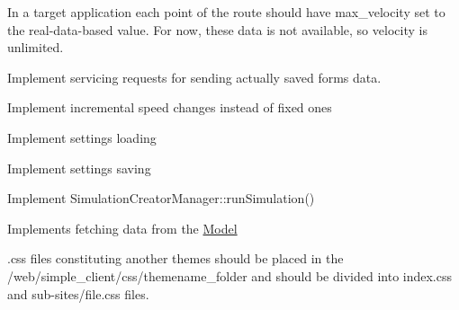 \begin{DoxyRefList}
\label{todo__todo000006}%
%
In a target application each point of the route should have max\+\_\+velocity set to the real-\/data-\/based value. For now, these data is not available, so velocity is unlimited.  
\item[Member \mbox{\hyperlink{class_controller_ad48b9c7e1d1fd40e88b817a79cf68a53}{Controller::\+\_\+\+\_\+creator\+Action}} (const std\+::string \&action\+\_\+type, const std\+::string \&body)]\label{todo__todo000001}%
%
Implement servicing requests for sending actually saved forms data.  
\item[Member \mbox{\hyperlink{class_controller_a5d8811631ab0d7854440f9e7685983e0}{Controller::\+\_\+\+\_\+simulation\+Action}} (const std\+::string \&action\+\_\+type, const std\+::string \&body)]\label{todo__todo000002}%
%
Implement incremental speed changes instead of fixed ones  
\item[Member \mbox{\hyperlink{class_settings_manager_a8af0423a70cba1b011673af2cd80f192}{Settings\+Manager::\+\_\+\+\_\+load\+Settings}} ()]\label{todo__todo000008}%
%
Implement settings\textquotesingle{} loading  
\item[Member \mbox{\hyperlink{class_settings_manager_a9e3bf3fdc53227717810414cf259d488}{Settings\+Manager::\+\_\+\+\_\+save\+Settings}} ()]\label{todo__todo000009}%
%
Implement settings\textquotesingle{} saving  
\item[Member \mbox{\hyperlink{class_simulation_creator_manager_a7431086ef47e8f53e02221ed9d9c0fce}{Simulation\+Creator\+Manager::initialize\+Simulation}} ()]\label{todo__todo000010}%
%
Implement Simulation\+Creator\+Manager\+::run\+Simulation()  
\item[Member \mbox{\hyperlink{class_view_a74464ce66433fad56073298ec9632c85}{View::get\+Data}} (const std\+::string \&requested\+\_\+data)]\label{todo__todo000011}%
%
Implements fetching data from the \mbox{\hyperlink{class_model}{Model}}  
\item[Member \mbox{\hyperlink{class_view_a7a3cdb6874e250bc539b757c9495e80a}{View::get\+Resource}} (const std\+::string \&target, bool \&is\+\_\+redirect)]\label{todo__todo000007}%
%
.css files constituting another themes should be placed in the /web/simple\+\_\+client/css/themename\+\_\+folder and should be divided into index.\+css and sub-\/sites/file.\+css files.
\end{DoxyRefList}